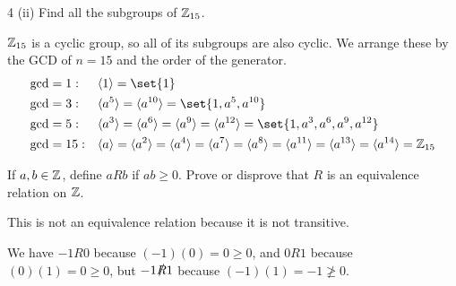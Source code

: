 \documentclass[11pt]{penrose}
\begin{document}
\begin{problem}{4 (ii)}
    Find all the subgroups of $\mathbb{Z}_{15}$.

    \solution $\mathbb{Z}_{15}$ is a cyclic group, so all of its subgroups are also cyclic. We arrange these by the GCD of $n = 15$ and the order of the generator.
    \begin{equation*}
    \begin{aligned}
        \gcd &= 1:  & & \cyclic{1}   = \set{1}\\
        \gcd &= 3:  & & \cyclic{a^5} = \cyclic{a^{10}} = \set{1, a^5, a^{10}}\\
        \gcd &= 5:  & & \cyclic{a^3} = \cyclic{a^6} = \cyclic{a^9} = \cyclic{a^{12}} = \set{1, a^3, a^6, a^9, a^{12}}\\
        \gcd &= 15: & & \cyclic{a} = \cyclic{a^2} = \cyclic{a^4} = \cyclic{a^7} = \cyclic{a^8} = \cyclic{a^{11}} = \cyclic{a^{13}} = \cyclic{a^{14}} = \Z_{15}
    \end{aligned}
    \end{equation*}
\end{problem}

\begin{problem}{5}
    If $a, b \in \mathbb{Z}$, define $a R b$ if $ab \geq 0$. Prove or disprove that $R$ is an equivalence relation on $\mathbb{Z}$.

    \solution This is not an equivalence relation because it is not transitive.

    We have $-1 R 0$ because $(-1)(0) = 0 \geq 0$, and $0 R 1$ because $(0)(1) = 0 \geq 0$, but $-1 \slashed{R} 1$ because $(-1)(1) = -1 \ngeq 0$.
\end{problem}
\end{document}
